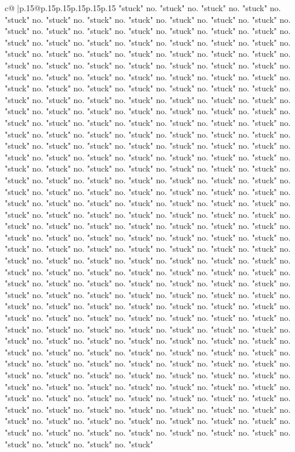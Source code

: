 \documentclass{article}
\begin{document}
{\begin{supertabular}{c@{$\;$}|p{.15\linewidth}@{}p{.15\linewidth}p{.15\linewidth}p{.15\linewidth}p{.15\linewidth}p{.15\linewidth}}
{{{"stuck" no. "stuck" no. "stuck" no. "stuck" no. "stuck" no. "stuck" no. "stuck" no. "stuck" no. "stuck" no. "stuck" no. "stuck" no. "stuck" no. "stuck" no. "stuck" no. "stuck" no. "stuck" no. "stuck" no. "stuck" no. "stuck" no. "stuck" no. "stuck" no. "stuck" no. "stuck" no. "stuck" no. "stuck" no. "stuck" no. "stuck" no. "stuck" no. "stuck" no. "stuck" no. "stuck" no. "stuck" no. "stuck" no. "stuck" no. "stuck" no. "stuck" no. "stuck" no. "stuck" no. "stuck" no. "stuck" no. "stuck" no. "stuck" no. "stuck" no. "stuck" no. "stuck" no. "stuck" no. "stuck" no. "stuck" no. "stuck" no. "stuck" no. "stuck" no. "stuck" no. "stuck" no. "stuck" no. "stuck" no. "stuck" no. "stuck" no. "stuck" no. "stuck" no. "stuck" no. "stuck" no. "stuck" no. "stuck" no. "stuck" no. "stuck" no. "stuck" no. "stuck" no. "stuck" no. "stuck" no. "stuck" no. "stuck" no. "stuck" no. "stuck" no. "stuck" no. "stuck" no. "stuck" no. "stuck" no. "stuck" no. "stuck" no. "stuck" no. "stuck" no. "stuck" no. "stuck" no. "stuck" no. "stuck" no. "stuck" no. "stuck" no. "stuck" no. "stuck" no. "stuck" no. "stuck" no. "stuck" no. "stuck" no. "stuck" no. "stuck" no. "stuck" no. "stuck" no. "stuck" no. "stuck" no. "stuck" no. "stuck" no. "stuck" no. "stuck" no. "stuck" no. "stuck" no. "stuck" no. "stuck" no. "stuck" no. "stuck" no. "stuck" no. "stuck" no. "stuck" no. "stuck" no. "stuck" no. "stuck" no. "stuck" no. "stuck" no. "stuck" no. "stuck" no. "stuck" no. "stuck" no. "stuck" no. "stuck" no. "stuck" no. "stuck" no. "stuck" no. "stuck" no. "stuck" no. "stuck" no. "stuck" no. "stuck" no. "stuck" no. "stuck" no. "stuck" no. "stuck" no. "stuck" no. "stuck" no. "stuck" no. "stuck" no. "stuck" no. "stuck" no. "stuck" no. "stuck" no. "stuck" no. "stuck" no. "stuck" no. "stuck" no. "stuck" no. "stuck" no. "stuck" no. "stuck" no. "stuck" no. "stuck" no. "stuck" no. "stuck" no. "stuck" no. "stuck" no. "stuck" no. "stuck" no. "stuck" no. "stuck" no. "stuck" no. "stuck" no. "stuck" no. "stuck" no. "stuck" no. "stuck" no. "stuck" no. "stuck" no. "stuck" no. "stuck" no. "stuck" no. "stuck" no. "stuck" no. "stuck" no. "stuck" no. "stuck" no. "stuck" no. "stuck" no. "stuck" no. "stuck" no. "stuck" no. "stuck" no. "stuck" no. "stuck" no. "stuck" no. "stuck" no. "stuck" no. "stuck" no. "stuck" no. "stuck" no. "stuck" no. "stuck" no. "stuck" no. "stuck" no. "stuck" no. "stuck" no. "stuck" no. "stuck" no. "stuck" no. "stuck" no. "stuck" no. "stuck" no. "stuck" no. "stuck" no. "stuck" no. "stuck" no. "stuck" no. "stuck" no. "stuck" no. "stuck" no. "stuck" no. "stuck" no. "stuck" no. "stuck" no. "stuck" no. "stuck" no. "stuck" no. "stuck" no. "stuck" no. "stuck" no. "stuck" no. "stuck" no. "stuck" no. "stuck" no. "stuck" no. "stuck" no. "stuck" no. "stuck" no. "stuck" no. "stuck" no. "stuck" no. "stuck" no. "stuck" no. "stuck" no. "stuck" no. "stuck" no. "stuck" no. "stuck" no. "stuck" no. "stuck" no. "stuck" no. "stuck" no. "stuck" no. "stuck" no. "stuck" no. "stuck" no. "stuck" no. "stuck" no. "stuck" no. "stuck" no. "stuck" no. "stuck" no. "stuck" no. "stuck" no. "stuck" no. "stuck" no. "stuck" no. "stuck" no. "stuck" no. "stuck" no. "stuck" no. "stuck" no. "stuck" no. "stuck" no. "stuck" no. "stuck" }}}
\end{supertabular}}
\end{document}
